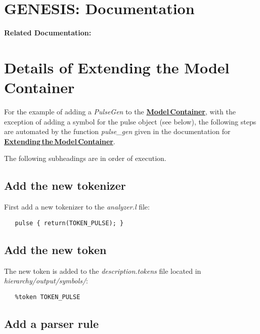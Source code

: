 \documentclass[12pt]{article}
\begin{document}
\section*{GENESIS: Documentation}

{\bf Related Documentation:}

\section*{Details of Extending the Model\,Container}

For the example of adding a {\it PulseGen} to the \href{../model-container/model-container.tex}{\bf Model\,Container}, with the exception of adding a symbol for the pulse object (see below), the following steps are automated by the function {\it pulse\_gen} given in the documentation for \href{../genesis-extend-model-container/extend-model-container.tex}{\bf Extending\,the\,Model\,Container}.

The following subheadings are in order of execution.

\subsection*{Add the new tokenizer}

First add a new tokenizer to the {\it analyzer.l} file:
\begin{verbatim}
   pulse { return(TOKEN_PULSE); }
\end{verbatim}

\subsection*{Add the new token}

The new token is added to the {\it description.tokens} file located in {\it hierarchy/output/symbols/}:
\begin{verbatim}
   %token TOKEN_PULSE
\end{verbatim}

\subsection*{Add a parser rule}
\end{document}
